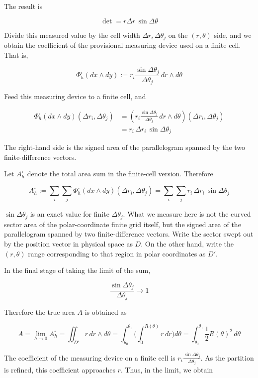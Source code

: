 The result is

\[\det = r\Delta r\,\sin\Delta\theta\]

Divide this measured value by the cell width
\(\Delta r_i\,\Delta\theta_j\) on the \((r,\theta)\) side, and we obtain
the coefficient of the provisional measuring device used on a finite
cell. That is,

\[
\Phi_h^\square(dx\wedge dy)
:=
r_i\frac{\sin\Delta\theta_j}{\Delta\theta_j}\,dr\wedge d\theta
\]

Feed this measuring device to a finite cell, and

\[
\begin{aligned}
\Phi_h^\square(dx\wedge dy)(\Delta r_i,\Delta\theta_j)
&=
\left(
r_i\frac{\sin\Delta\theta_j}{\Delta\theta_j}\,dr\wedge d\theta
\right)(\Delta r_i,\Delta\theta_j) \\
&=
r_i\,\Delta r_i\,\sin\Delta\theta_j
\end{aligned}
\]

The right-hand side is the signed area of the parallelogram spanned by
the two finite-difference vectors.

Let \(A_h^\square\) denote the total area sum in the finite-cell
version. Therefore

\[
A_h^\square
:=
\sum_i\sum_j
\Phi_h^\square(dx\wedge dy)(\Delta r_i,\Delta\theta_j)
=
\sum_i\sum_j r_i\,\Delta r_i\,\sin\Delta\theta_j
\]

\(\sin\Delta\theta_j\) is an exact value for finite \(\Delta\theta_j\).
What we measure here is not the curved sector area of the
polar-coordinate finite grid itself, but the signed area of the
parallelogram spanned by two finite-difference vectors. Write the sector
swept out by the position vector in physical space as \(D\). On the
other hand, write the \((r,\theta)\) range corresponding to that region
in polar coordinates as \(D'\).

In the final stage of taking the limit of the sum,

\[
\frac{\sin\Delta\theta_j}{\Delta\theta_j}\to 1
\]

Therefore the true area \(A\) is obtained as

\[
A
=
\lim_{h\to0} A_h^\square
=
\iint_{D'} r\,dr\wedge d\theta
=
\int_{\theta_0}^{\theta_1}
\biggl(
  \int_0^{R(\theta)} r\,dr
\biggr)
d\theta
=
\int_{\theta_0}^{\theta_1}
\frac{1}{2}R(\theta)^2\,d\theta
\]

The coefficient of the measuring device on a finite cell is
\(r_i\frac{\sin\Delta\theta_j}{\Delta\theta_j}\). As the partition is
refined, this coefficient approaches \(r\). Thus, in the limit, we
obtain

